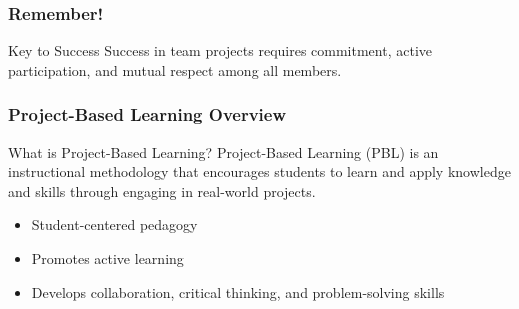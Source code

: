 \documentclass[aspectratio=169]{beamer}
\begin{document}
\begin{frame}[fragile]
    \frametitle{Remember!}
    \begin{block}{Key to Success}
        Success in team projects requires commitment, active participation, and mutual respect among all members.
    \end{block}
\end{frame}

\begin{frame}[fragile]
    \frametitle{Project-Based Learning Overview}
    \begin{block}{What is Project-Based Learning?}
        Project-Based Learning (PBL) is an instructional methodology that encourages students to learn and apply knowledge and skills through engaging in real-world projects. 
    \end{block}
    \begin{itemize}
        \item Student-centered pedagogy
        \item Promotes active learning
        \item Develops collaboration, critical thinking, and problem-solving skills
    \end{itemize}
\end{frame}
\end{document}
